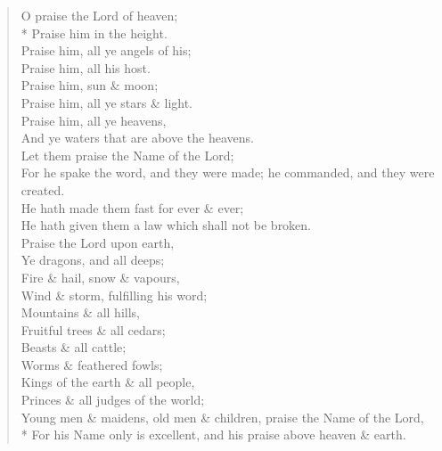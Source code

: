 \documentclass[MAIN]{subfiles}
\begin{document}
\begin{verse}
O praise the Lord of heaven;\\*
\vin Praise him in the height.\\
Praise him, all ye angels of his;\\
\vin Praise him, all his host.\\
Praise him, sun \& moon;\\
\vin Praise him, all ye stars \& light.\\
Praise him, all ye heavens,\\
\vin And ye waters that are above the heavens.\\
Let them praise the Name of the Lord;\\
\vin For he spake the word, and they were made; he commanded, and they were created.\\
He hath made them fast for ever \& ever;\\
\vin He hath given them a law which shall not be broken.\\
Praise the Lord upon earth,\\
\vin Ye dragons, and all deeps;\\
Fire \& hail, snow \& vapours,\\
\vin Wind \& storm, fulfilling his word;\\
Mountains \& all hills,\\
\vin Fruitful trees \& all cedars;\\
Beasts \& all cattle;\\
\vin Worms \& feathered fowls;\\
Kings of the earth \& all people,\\
\vin Princes \& all judges of the world;\\
Young men \& maidens, old men \& children, praise the Name of the Lord,\\*
\vin For his Name only is excellent, and his praise above heaven \& earth.
\end{verse}
\end{document}
